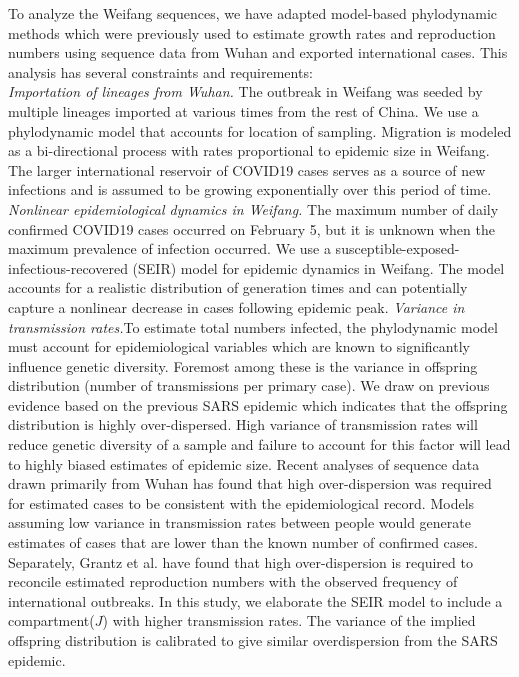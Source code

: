 \documentclass[9pt,lineno,onehalfspacing]{elife}
\begin{document}
To analyze the Weifang sequences, we have adapted model-based phylodynamic methods which were previously used to estimate growth rates and reproduction numbers using sequence data from Wuhan and exported international cases\citep{report5}.
This analysis has several constraints and requirements: \\
{\flushleft\it Importation of lineages from Wuhan.} The outbreak in Weifang was seeded by multiple lineages imported at various times from the rest of China. We use a  phylodynamic model that accounts for location of sampling. Migration is modeled as a bi-directional process with rates proportional to epidemic size in Weifang. The larger international reservoir of COVID19 cases serves as a source of new infections and is assumed to be growing exponentially over this period of time. 
{\flushleft\it Nonlinear epidemiological dynamics in Weifang.} The maximum number of daily confirmed COVID19 cases occurred on February 5, but it is unknown when the maximum prevalence of infection occurred. 
We use a susceptible-exposed-infectious-recovered (SEIR) model\citep{Keeling2011-wp} for epidemic dynamics in Weifang. 
The model accounts for a realistic distribution of generation times and can potentially capture a nonlinear decrease in cases following epidemic peak.
{\flushleft\it Variance in transmission rates\citep{Lloyd-Smith2005-oz}.}To estimate total numbers infected, the phylodynamic model must account for epidemiological variables which are known to significantly influence genetic diversity. 
Foremost among these is the variance in offspring distribution (number of transmissions per primary case). 
We draw on previous evidence based on the previous SARS epidemic which indicates that the offspring distribution is highly over-dispersed. 
High variance of transmission rates will reduce genetic diversity of a sample and failure to account for this factor will lead to highly biased estimates of epidemic size\citep{Li2017-mi}. 
Recent analyses of sequence data drawn primarily from Wuhan has found that high over-dispersion was required for estimated cases to be consistent with the epidemiological record\citep{report5}. 
Models assuming low variance in transmission rates between people would generate estimates of cases that are lower than the known number of confirmed cases. 
Separately, Grantz et al.\citep{Grantz_undated-ah} have found that high over-dispersion is required to reconcile estimated reproduction numbers with the observed frequency of international outbreaks. 
In this study, we elaborate the SEIR model to include a compartment($J$) with higher transmission rates. 
The variance of the implied offspring distribution is calibrated to give similar overdispersion from the SARS epidemic.
\end{document}
